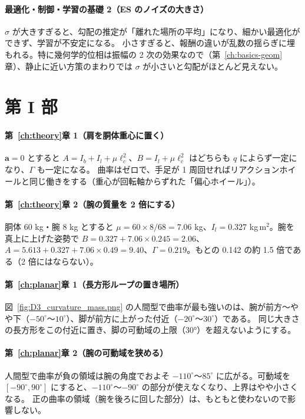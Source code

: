 \paragraph{最適化・制御・学習の基礎 2（ES のノイズの大きさ）}
$\sigma$ が大きすぎると、勾配の推定が「離れた場所の平均」になり、細かい最適化ができず、学習が不安定になる。
小さすぎると、報酬の違いが乱数の揺らぎに埋もれる。特に幾何学的位相は振幅の 2 次の効果なので（第~\ref{ch:basics-geom}章）、静止に近い方策のまわりでは $\sigma$ が小さいと勾配がほとんど見えない。

\section{第 I 部}

\paragraph{第~\ref{ch:theory}章 1（肩を胴体重心に置く）}
$\bm a=0$ とすると $A=I_b+I_l+\mu\ell_c^2$、$B=I_l+\mu\ell_c^2$ はどちらも $q$ によらず一定になり、$\Gamma$ も一定になる。
曲率はゼロで、手足が 1 周回せればリアクションホイールと同じ働きをする（重心が回転軸からずれた「偏心ホイール」）。

\paragraph{第~\ref{ch:theory}章 2（腕の質量を 2 倍にする）}
胴体 60 kg・腕 8 kg とすると $\mu=60\times8/68=7.06$ kg、$I_l=0.327$ kg\,m$^2$。腕を真上に上げた姿勢で
$B=0.327+7.06\times0.245=2.06$、$A=5.613+0.327+7.06\times0.49=9.40$、$\Gamma=0.219$。もとの 0.142 の約 1.5 倍である（2 倍にはならない）。

\paragraph{第~\ref{ch:planar}章 1（長方形ループの置き場所）}
図~\ref{fig:D3_curvature_mass.png} の人間型で曲率が最も強いのは、腕が前方〜やや下（$-50^\circ$〜$10^\circ$）、脚が前方に上がった付近（$-20^\circ$〜$30^\circ$）である。
同じ大きさの長方形をこの付近に置き、脚の可動域の上限（30°）を超えないようにする。

\paragraph{第~\ref{ch:planar}章 2（腕の可動域を狭める）}
人間型で曲率が負の領域は腕の角度でおよそ $-110^\circ$〜$85^\circ$ に広がる。可動域を $[-90^\circ,90^\circ]$ にすると、$-110^\circ$〜$-90^\circ$ の部分が使えなくなり、上界はやや小さくなる。
正の曲率の領域（腕を後ろに回した部分）は、もともと使わないので影響しない。

